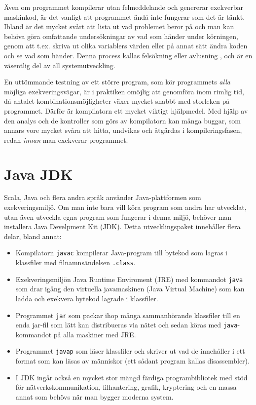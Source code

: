 Även om programmet kompilerar utan felmeddelande och genererar exekverbar maskinkod, är det vanligt att programmet ändå inte fungerar som det är tänkt. Ibland är det mycket svårt att lista ut vad problemet beror på och man kan behöva göra omfattande undersökningar av vad som händer under körningen, genom att t.ex. skriva ut olika variablers värden eller på annat sätt ändra koden och se vad som händer. Denna process kallas felsökning eller avlusning , och är en väsentlig del av all systemutveckling. 

En uttömmande testning av ett större program, som kör programmets \textit{alla} möjliga exekveringsvägar, är i praktiken omöjlig att genomföra inom rimlig tid, då antalet kombinationsmöjligheter växer mycket snabbt med storleken på programmet. 
Därför är kompilatorn ett mycket viktigt hjälpmedel. Med hjälp av den analys och de kontroller som görs av kompilatorn kan många buggar, som annars vore mycket svåra att hitta, undvikas och åtgärdas i kompileringsfasen, redan \textit{innan} man exekverar programmet. 


\section{Java JDK}

Scala, Java och flera andra språk använder Java-plattformen som exekveringsmiljö. Om man inte bara vill köra program som andra har utvecklat, utan även utveckla egna program som fungerar i denna miljö, behöver man installera Java Develpment Kit (JDK). Detta utvecklingspaket innehåller flera delar, bland annat:

\begin{itemize}

\item Kompilatorn \texttt{javac} kompilerar Java-program till bytekod som lagras i klassfiler med filnamnsändelsen \texttt{.class}.

\item Exekveringsmiljön Java Runtime Enviroment (JRE) med kommandot \texttt{java} som drar igång den virtuella javamaskinen (Java Virtual Machine) som kan ladda och exekvera bytekod lagrade i klassfiler.

\item Programmet \texttt{jar} som packar ihop många sammanhörande klassfiler till en enda jar-fil som lätt kan distribueras via nätet och sedan köras med \texttt{java}-kommandot på alla maskiner med JRE. 

\item Programmet \texttt{javap} som läser klassfiler och skriver ut vad de innehåller i ett format som kan läsas av människor (ett sådant program kallas disassembler).

\item I JDK ingår också en mycket stor mängd färdiga programbibliotek med stöd för nätverkskommunikation, filhantering, grafik, kryptering och en massa annat som behövs när man bygger moderna system. 

\end{itemize}  

